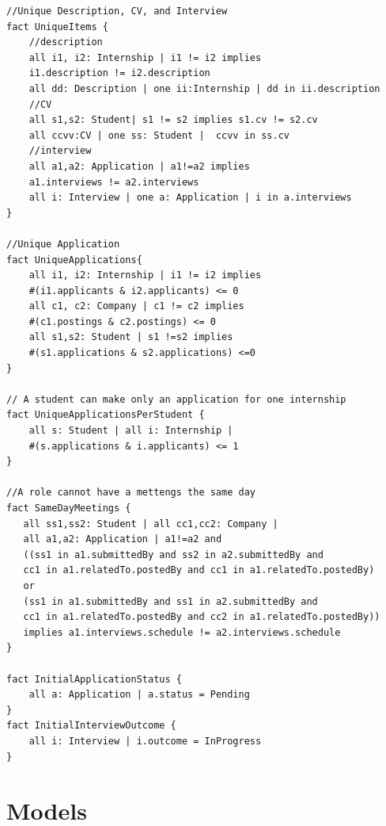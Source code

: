 \begin{lstlisting}
//Unique Description, CV, and Interview 
fact UniqueItems {
    //description
    all i1, i2: Internship | i1 != i2 implies
    i1.description != i2.description
    all dd: Description | one ii:Internship | dd in ii.description
    //CV
    all s1,s2: Student| s1 != s2 implies s1.cv != s2.cv
    all ccvv:CV | one ss: Student |  ccvv in ss.cv
    //interview
    all a1,a2: Application | a1!=a2 implies 
    a1.interviews != a2.interviews
    all i: Interview | one a: Application | i in a.interviews
}

//Unique Application
fact UniqueApplications{
    all i1, i2: Internship | i1 != i2 implies 
    #(i1.applicants & i2.applicants) <= 0
    all c1, c2: Company | c1 != c2 implies 
    #(c1.postings & c2.postings) <= 0
    all s1,s2: Student | s1 !=s2 implies 
    #(s1.applications & s2.applications) <=0
}

// A student can make only an application for one internship
fact UniqueApplicationsPerStudent {
    all s: Student | all i: Internship | 
    #(s.applications & i.applicants) <= 1
}

//A role cannot have a mettengs the same day
fact SameDayMeetings {
   all ss1,ss2: Student | all cc1,cc2: Company |
   all a1,a2: Application | a1!=a2 and
   ((ss1 in a1.submittedBy and ss2 in a2.submittedBy and
   cc1 in a1.relatedTo.postedBy and cc1 in a1.relatedTo.postedBy)
   or
   (ss1 in a1.submittedBy and ss1 in a2.submittedBy and
   cc1 in a1.relatedTo.postedBy and cc2 in a1.relatedTo.postedBy))
   implies a1.interviews.schedule != a2.interviews.schedule
}

fact InitialApplicationStatus {
    all a: Application | a.status = Pending
}
fact InitialInterviewOutcome {
    all i: Interview | i.outcome = InProgress
}

\end{lstlisting}



\section{ Models}
